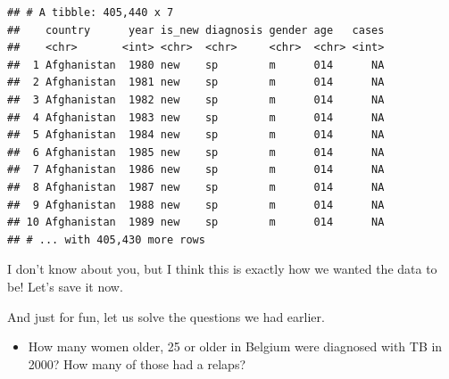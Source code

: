 \documentclass[]{tufte-book}
\newenvironment{Shaded}{}{}
\newcommand{\DataTypeTok}[1]{\textcolor[rgb]{0.56,0.13,0.00}{#1}}
\newcommand{\DecValTok}[1]{\textcolor[rgb]{0.25,0.63,0.44}{#1}}
\newcommand{\KeywordTok}[1]{\textcolor[rgb]{0.00,0.44,0.13}{\textbf{#1}}}
\newcommand{\NormalTok}[1]{#1}
\newcommand{\OperatorTok}[1]{\textcolor[rgb]{0.40,0.40,0.40}{#1}}
\newcommand{\StringTok}[1]{\textcolor[rgb]{0.25,0.44,0.63}{#1}}
\providecommand{\tightlist}{%
  \setlength{\itemsep}{0pt}\setlength{\parskip}{0pt}}
\begin{document}
\begin{verbatim}
## # A tibble: 405,440 x 7
##    country      year is_new diagnosis gender age   cases
##    <chr>       <int> <chr>  <chr>     <chr>  <chr> <int>
##  1 Afghanistan  1980 new    sp        m      014      NA
##  2 Afghanistan  1981 new    sp        m      014      NA
##  3 Afghanistan  1982 new    sp        m      014      NA
##  4 Afghanistan  1983 new    sp        m      014      NA
##  5 Afghanistan  1984 new    sp        m      014      NA
##  6 Afghanistan  1985 new    sp        m      014      NA
##  7 Afghanistan  1986 new    sp        m      014      NA
##  8 Afghanistan  1987 new    sp        m      014      NA
##  9 Afghanistan  1988 new    sp        m      014      NA
## 10 Afghanistan  1989 new    sp        m      014      NA
## # ... with 405,430 more rows
\end{verbatim}

I don't know about you, but I think this is exactly how we wanted the data to be! Let's save it now.

\begin{Shaded}
\end{Shaded}

And just for fun, let us solve the questions we had earlier.

\begin{itemize}
\tightlist
\item
  How many women older, 25 or older in Belgium were diagnosed with TB in 2000? How many of those had a relaps?
\end{itemize}
\end{document}
